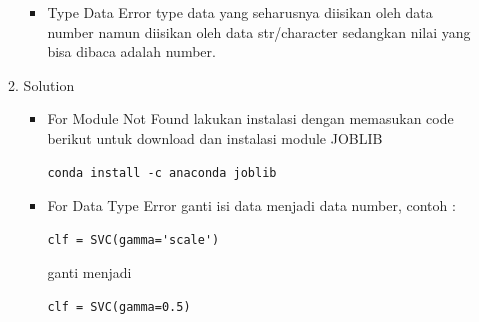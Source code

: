 \begin{enumerate}
\begin{enumerate}
\begin{itemize}
\item
Type Data Error
\subitem
type data yang seharusnya diisikan oleh data number namun diisikan oleh data str/character sedangkan nilai yang bisa dibaca adalah number.
\end{itemize}

\item
Solution
\begin{itemize}
\item
For Module Not Found
\subitem
lakukan instalasi dengan memasukan code berikut untuk download dan instalasi module JOBLIB
\begin{verbatim}
conda install -c anaconda joblib
\end{verbatim}

\item
For Data Type Error
\subitem
ganti isi data menjadi data number, contoh :
\begin{verbatim}
clf = SVC(gamma='scale')
\end{verbatim}
ganti menjadi 
\begin{verbatim}
clf = SVC(gamma=0.5)
\end{verbatim}
\end{itemize}

\end{enumerate}
\end{enumerate}
